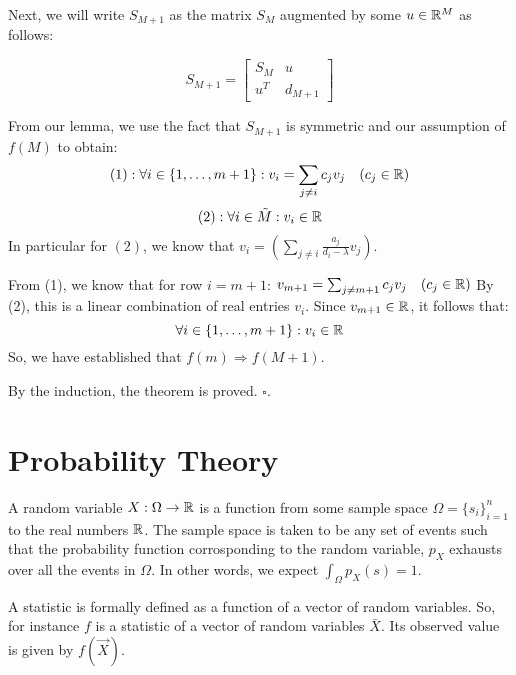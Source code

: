 Next, we will write $S_{M+1}$ as the matrix $S_M$ augmented by some $u \in \mathbb{R}^M$ as follows:

$$ S_{M+1} =
\left[
  \begin{array}{c|c}
  S_M & u\\
  \hline
  u^T & d_{M+1}
\end{array} \right]$$

From our lemma, we use the fact that $S_{M+1}$ is symmetric and our assumption of $f(M)$ to obtain:
$$(1): \forall i \in \{1,\dots,m+1\}: v_i =  {\sum_{j \neq i} c_j v_j} \quad (c_j \in \mathbb{R})$$
$$(2): \forall i \in \tilde{M} : v_i \in \mathbb{R}$$
In particular for $(2)$, we know that $v_i = \left({\sum_{j \neq i} \frac{a_j}{d_i-\lambda} v_j}\right)$.


From (1), we know that for row $i = m+1$:
$v_{m+1} =  {\sum_{j \neq {m+1}} c_j v_j} \quad (c_j \in \mathbb{R})$
By (2), this is a linear combination of real entries $v_i$. Since $v_{m+1} \in \mathbb{R}$, it follows that:
$$\forall i \in \{1,\dots,m+1\}: v_i \in \mathbb{R}$$
So, we have established that $f(m) \Rightarrow f(M+1)$.

By the induction, the theorem is proved. $\square$.


\newpage
\section{Probability Theory}

\begin{definition}
A random variable $X: \Omega \to \mathbb{R}$ is a function from some sample space $\Omega = \{s_i\}_{i=1}^n$ to the real numbers $\mathbb{R}$. The sample space is taken to be any set of events such that the probability function corrosponding to the random variable, $p_X$ exhausts over all the events in $\Omega$. In other words, we expect $\int_\Omega p_X(s) = 1$.
\end{definition}

\begin{definition}[Statistic]
A statistic is formally defined as a function of a vector of random variables. So, for instance $f$ is a statistic of a vector of random variables $\bar{X}$. Its observed value is given by $f(\vec{X})$.
\end{definition}

